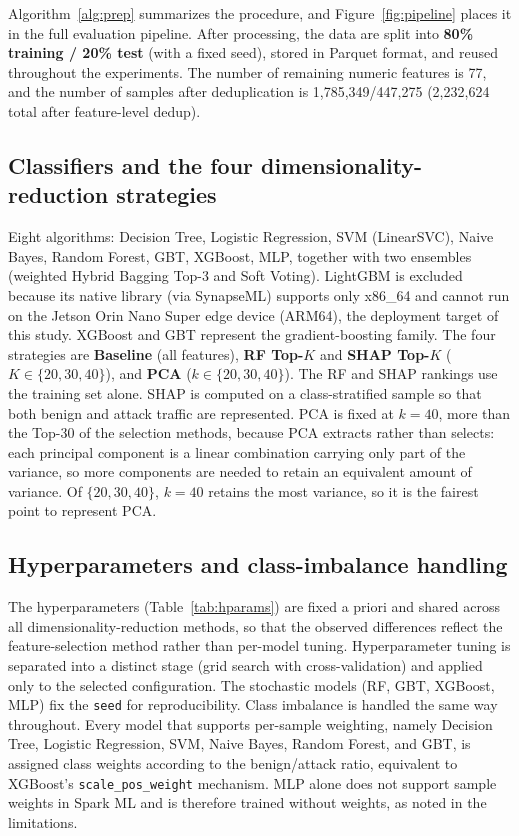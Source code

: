 \documentclass[11pt,conference,a4paper]{IEEEtran}
\begin{document}
Algorithm~\ref{alg:prep} summarizes the procedure, and Figure~\ref{fig:pipeline} places it in the full evaluation pipeline. After processing, the data are split into \textbf{80\% training / 20\% test} (with a fixed seed), stored in Parquet format, and reused throughout the experiments. The number of remaining numeric features is 77, and the number of samples after deduplication is 1,785,349/447,275 (2,232,624 total after feature-level dedup).

\subsection{Classifiers and the four dimensionality-reduction strategies}

Eight algorithms: Decision Tree, Logistic Regression, SVM (LinearSVC), Naive Bayes, Random Forest, GBT, XGBoost, MLP, together with two ensembles (weighted Hybrid Bagging Top-3 and Soft Voting). LightGBM is excluded because its native library (via SynapseML) supports only x86\_64 and cannot run on the Jetson Orin Nano Super edge device (ARM64), the deployment target of this study. XGBoost and GBT represent the gradient-boosting family. The four strategies are \textbf{Baseline} (all features), \textbf{RF Top-$K$} and \textbf{SHAP Top-$K$} ($K \in \{20,30,40\}$), and \textbf{PCA} ($k \in \{20,30,40\}$). The RF and SHAP rankings use the training set alone. SHAP is computed on a class-stratified sample so that both benign and attack traffic are represented. PCA is fixed at $k{=}40$, more than the Top-30 of the selection methods, because PCA extracts rather than selects: each principal component is a linear combination carrying only part of the variance, so more components are needed to retain an equivalent amount of variance. Of $\{20,30,40\}$, $k{=}40$ retains the most variance, so it is the fairest point to represent PCA.

\subsection{Hyperparameters and class-imbalance handling}
\label{sec:hparams}

The hyperparameters (Table~\ref{tab:hparams}) are fixed a priori and shared across all dimensionality-reduction methods, so that the observed differences reflect the feature-selection method rather than per-model tuning. Hyperparameter tuning is separated into a distinct stage (grid search with cross-validation) and applied only to the selected configuration. The stochastic models (RF, GBT, XGBoost, MLP) fix the \texttt{seed} for reproducibility. Class imbalance is handled the same way throughout. Every model that supports per-sample weighting, namely Decision Tree, Logistic Regression, SVM, Naive Bayes, Random Forest, and GBT, is assigned class weights according to the benign/attack ratio, equivalent to XGBoost's \texttt{scale\_pos\_weight} mechanism. MLP alone does not support sample weights in Spark ML and is therefore trained without weights, as noted in the limitations.
\end{document}
